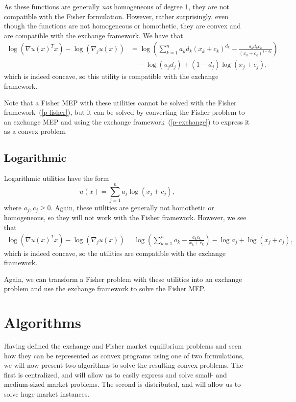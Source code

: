 \documentclass[12pt]{article}
\begin{document}
As these functions are generally \emph{not} homogeneous of degree 1,
they are not compatible with the Fisher formulation.
However, rather surprisingly, even though the
functions are not homogeneous or homothetic, they are
convex and are compatible with the exchange framework.
We have that
\begin{align*}
\log(\nabla u(x)^T x) - \log(\nabla_j u(x))
&= \log\left(\sum_{k=1}^n a_k d_k (x_k+c_k)^{d_k} - \frac{a_k d_k c_k}{(x_k + c_k)^{1-d_k}} \right)\\
&\quad- \log(a_j d_j) + (1-d_j)\log (x_j + c_j),
\end{align*}
which is indeed concave, so this utility is compatible with
the exchange framework.

Note that a Fisher MEP with these utilities cannot be solved with the Fisher
framework~(\ref{p-fisher}), but it can be solved by converting the Fisher
problem to an exchange MEP and using the exchange framework~(\ref{p-exchange})
to express it as a convex problem.


\subsection{Logarithmic}
Logarithmic utilities have the form
\[
u(x) = \sum_{j=1}^n a_j \log(x_j+ c_j),
\]
where $a_j, c_j \geq 0$.
Again, these utilities are generally not homothetic or
homogeneous, so they will not work with the Fisher framework.
However, we see that 
\begin{align*}
\log(\nabla u(x)^T x) - \log(\nabla_j u(x)) =
\log\left(\sum_{k=1}^n a_k - \frac{a_k c_k}{x_k+c_k} \right) - \log a_j + \log (x_j + c_j),
\end{align*}
which is indeed concave, so the utilities are compatible
with the exchange framework.

Again, we can transform a Fisher problem with these utilities into
an exchange problem and use the exchange framework to solve
the Fisher MEP.

\section{Algorithms}

Having defined the exchange and Fisher market equilibrium problems and seen how
they can be represented as convex programs using one of two formulations, we
will now present two algorithms to solve the resulting convex problems. The
first is centralized, and will allow us to easily express and solve small- and
medium-sized market problems. The second is distributed, and will allow us to
solve huge market instances.
\end{document}

